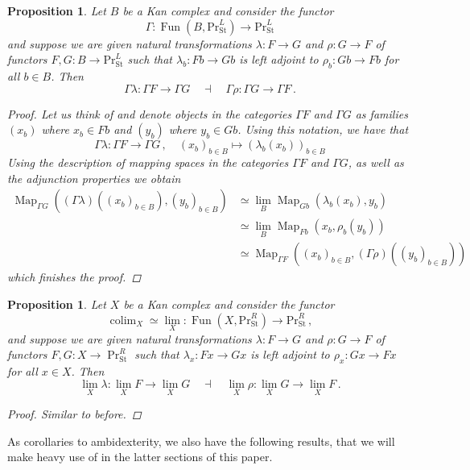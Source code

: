 \documentclass[10pt]{amsart}
\newcommand{\longto}{\longrightarrow}
\theoremstyle{plain}
\newtheorem{proposition}[theorem]{Proposition}
\theoremstyle{definition}
\DeclareMathOperator*{\colim}{colim}
\DeclareMathOperator{\Fun}{Fun}
\DeclareMathOperator{\Map}{Map}
\newcommand{\St}{\mathrm{St}}
\begin{document}
\begin{proposition} \label{prop:colim_preserves_adjoints}
  Let $B$ be a Kan complex and consider the functor
  \[
  \Gamma : \Fun(B,\mathrm{Pr}^{L}_{\St}) \longto \mathrm{Pr}^L_{\St}
  \]
  and suppose we are given natural transformations $\lambda : F \to G$ and $\rho : G \to F$ of functors $F,G : B \to \mathrm{Pr}^{L}_{\St}$ such that $\lambda_b : Fb \to Gb$ is left adjoint to $\rho_b : Gb \to Fb$ for all $b \in B$. Then
  \[
  \Gamma \lambda : \Gamma F \longto \Gamma G \quad \dashv \quad \Gamma \rho : \Gamma G \longto \Gamma F \,.
  \]
  \begin{proof}
    Let us think of and denote objects in the categories $\Gamma F$ and $\Gamma G$ as families $(x_b)$ where $x_b \in Fb$ and $(y_b)$ where $y_b \in Gb$. Using this notation, we have that
    \[
    \Gamma \lambda : \Gamma F \longto \Gamma G \,, \quad (x_b)_{b \in B} \mapsto (\lambda_b(x_b))_{b \in B}
    \]
    Using the description of mapping spaces in the categories $\Gamma F$ and $\Gamma G$, as well as the adjunction properties we obtain
    \begin{align*}
      \Map_{\Gamma G}((\Gamma \lambda)((x_b)_{b \in B}),(y_b)_{b \in B}) &\simeq \lim_{B} \Map_{Gb}(\lambda_b(x_b),y_b) \\ &\simeq \lim_B \Map_{Fb}(x_b,\rho_b(y_b)) \\ &\simeq  \Map_{\Gamma F}((x_b)_{b \in B},(\Gamma \rho)((y_b)_{b \in B}))
    \end{align*}
    which finishes the proof.
    \end{proof}
\end{proposition}

\begin{proposition}
Let $X$ be a Kan complex and consider the functor
\[
\colim_X \simeq \lim_X : \Fun(X,\mathrm{Pr}^{R}_{\St}) \longto \mathrm{Pr}^R_{\St} \,,
\]
and suppose we are given natural transformations $\lambda : F \to G$ and $\rho : G \to F$ of functors $F,G : X \to \Pr^{R}_{\St}$ such that $\lambda_x : F x \to Gx$ is left adjoint to $\rho_x : Gx \to Fx$ for all $x \in X$. Then
\[
\lim_X \lambda : \lim_X F \longto \lim_X G \quad \dashv \quad \lim_X \rho : \lim_X G \longto \lim_X F \,.
\]
\begin{proof}
  Similar to before.
\end{proof}
\end{proposition}

As corollaries to ambidexterity, we also have the following results, that we will make heavy use of in the latter sections of this paper.
\end{document}
